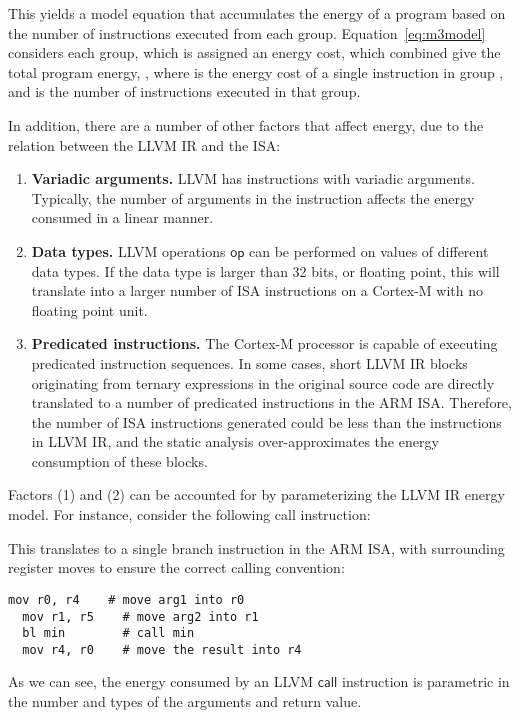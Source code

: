 \documentclass[9pt,preprint]{sigplanconf}
\newcommand{\mathspace}[1]{\ensuremath{#1}\xspace}
\newcommand{\instit}[1]{\mathspace{\mathsf{#1}}}
\newcommand{\op}{\instit{op}}
\newcommand{\call}{\instit{call}}
\begin{document}
This yields a model equation that accumulates the energy of a program based on
the number of instructions executed from each group. Equation~\ref{eq:m3model}
considers each group, which is assigned an energy cost, which combined give
the total program energy, , where  is the energy cost of a
single instruction in group , and  is the number of instructions executed in
that group.

In addition, there are a number of other factors that affect energy, due to the
relation between the LLVM IR and the ISA:

\begin{enumerate}

\item \textbf{Variadic arguments.}  LLVM has instructions with variadic
arguments. Typically, the number of arguments in the instruction affects the
energy consumed in a linear manner.
\vspace{-1mm}
\item \textbf{Data types.} LLVM operations \op can be performed on values of
different data types. If the data type is larger than 32 bits, or floating
point, this will  translate into a larger number of ISA instructions on a
Cortex-M with no floating point unit.

\item \textbf{Predicated instructions.} The Cortex-M processor is capable of
executing predicated instruction sequences. In some cases, short LLVM IR blocks
originating from ternary expressions in the original source code are directly
translated to a number of predicated instructions in the ARM ISA. Therefore, the
number of ISA instructions generated could be less than the instructions in LLVM
IR, and the static analysis over-approximates the energy consumption of these
blocks.
\end{enumerate}

Factors (1) and (2) can be accounted for by parameterizing the LLVM IR energy
model. For instance, consider the following call instruction:
\begin{llvmcode}[numbers=none]
\end{llvmcode}
This translates to a single branch instruction in the ARM ISA, with surrounding
register moves to ensure the correct calling convention:

{\nocaptionrule
\begin{lstlisting}[morekeywords={mov,bl},morecomment={[l]\#}]
  mov r0, r4    # move arg1 into r0
  mov r1, r5    # move arg2 into r1
  bl min        # call min
  mov r4, r0    # move the result into r4
\end{lstlisting}}
As we can see, the energy consumed by an LLVM \call instruction is
parametric in the number and types of the arguments and return value.
\end{document}

